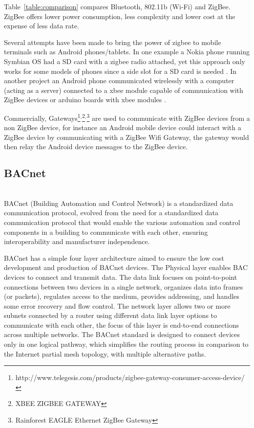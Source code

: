  Table~\ref{table:comparison} compares Bluetooth, 802.11b (Wi-Fi) and ZigBee. ZigBee \cite{article:zigbee_survey} offers lower power consumption, less complexity and lower cost at the expense of less data rate.

Several attempts have been made to bring the power of zigbee to mobile terminals such as Android phones/tablets. In one example a Nokia phone running Symbian OS had a SD card with a zigbee radio attached, yet this approach only works for some models of phones since a side slot for a SD card is needed \cite{Sensing_Platform}.
In another project an Android phone communicated wirelessly with a computer (acting as a server) connected to a xbee module capable of communication with ZigBee devices or arduino boards with xbee modules \cite{article:zigbee_android}.

Commercially, Gateways\footnote{http://www.telegesis.com/products/zigbee-gateway-consumer-access-device/}$^{,}$\footnote{XBEE ZIGBEE GATEWAY}$^{,}$\footnote{Rainforest EAGLE Ethernet ZigBee Gateway} are used to communicate with ZigBee devices from a non ZigBee device, for instance an Android mobile device could interact with a ZigBee device by communicating with a ZigBee Wifi Gateway, the gateway would then relay the Android device messages to the ZigBee device.


\subsection{BACnet}\mbox{}\\


BACnet (Building Automation and Control Network) \cite{livro_automation,bacnet:artigo1,bacnet:bib,livro_automation2} is a standardized data communication protocol, evolved from the need for a standardized data communication protocol that would enable the various automation and control components in a building to communicate with each other, ensuring interoperability and manufacturer independence.

BACnet has a simple four layer architecture aimed to ensure the low cost development and production of BACnet devices. The Physical layer enables BAC devices to connect and transmit data. The data link focuses on point-to-point connections between two devices in a single network, organizes data into frames (or packets), regulates access to the medium, provides addressing, and handles some error recovery and flow control.
The network layer allows two or more subnets connected by a router using different data link layer options to communicate with each other, the focus of this layer is end-to-end connections across multiple networks. The BACnet standard is designed to connect devices only in one logical pathway, which simplifies the routing process in comparison to the Internet partial mesh topology, with multiple alternative paths.

